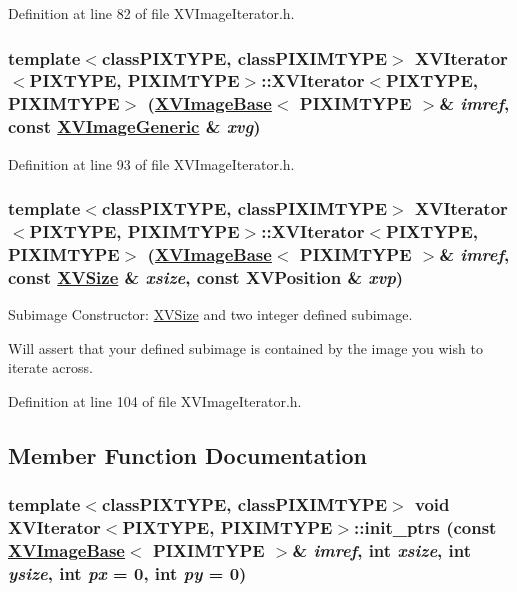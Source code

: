 Definition at line 82 of file XVImage\-Iterator.h.\label{XVIterator_a5}
\hypertarget{class_XVIterator_a5}{
\subsubsection[XVIterator]{\setlength{\rightskip}{0pt plus 5cm}template$<$classPIXTYPE, classPIXIMTYPE$>$ XVIterator$<$PIXTYPE, PIXIMTYPE$>$::XVIterator$<$PIXTYPE, PIXIMTYPE$>$ (\hyperlink{class_XVImageBase}{XVImage\-Base}$<$ PIXIMTYPE $>$\& {\em imref}, const \hyperlink{class_XVImageGeneric}{XVImage\-Generic} \& {\em xvg})}}




Definition at line 93 of file XVImage\-Iterator.h.\label{XVIterator_a6}
\hypertarget{class_XVIterator_a6}{
\subsubsection[XVIterator]{\setlength{\rightskip}{0pt plus 5cm}template$<$classPIXTYPE, classPIXIMTYPE$>$ XVIterator$<$PIXTYPE, PIXIMTYPE$>$::XVIterator$<$PIXTYPE, PIXIMTYPE$>$ (\hyperlink{class_XVImageBase}{XVImage\-Base}$<$ PIXIMTYPE $>$\& {\em imref}, const \hyperlink{class_XVSize}{XVSize} \& {\em xsize}, const XVPosition \& {\em xvp})}}


Subimage Constructor: \hyperlink{class_XVSize}{XVSize} and two integer defined subimage.

Will assert that your defined subimage is contained by the image you wish to iterate across. 

Definition at line 104 of file XVImage\-Iterator.h.

\subsection{Member Function Documentation}
\label{XVIterator_b1}
\hypertarget{class_XVIterator_b1}{
\subsubsection[init_ptrs]{\setlength{\rightskip}{0pt plus 5cm}template$<$classPIXTYPE, classPIXIMTYPE$>$ void XVIterator$<$PIXTYPE, PIXIMTYPE$>$::init\_\-ptrs (const \hyperlink{class_XVImageBase}{XVImage\-Base}$<$ PIXIMTYPE $>$\& {\em imref}, int {\em xsize}, int {\em ysize}, int {\em px} = 0, int {\em py} = 0)}}




